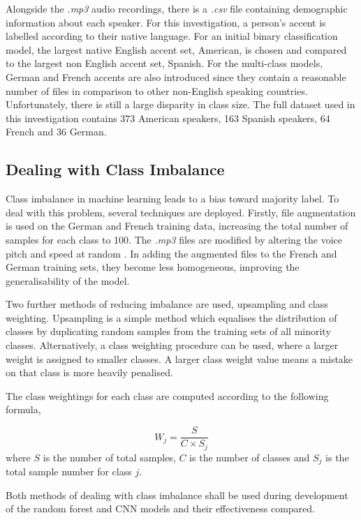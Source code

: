 \documentclass[conference]{IEEEtran}
\begin{document}
\bigbreak{}

Alongside the \textit{.mp3} audio recordings, there is a \textit{.csv} file containing demographic information about each speaker. For this investigation, a person's accent is labelled according to their native language. For an initial binary classification model, the largest native English accent set, American, is chosen and compared to the largest non English accent set, Spanish. For the multi-class models, German and French accents are also introduced since they contain a reasonable number of files in comparison to other non-English speaking countries. Unfortunately, there is still a large disparity in class size. The full dataset used in this investigation contains 373 American speakers, 163 Spanish speakers, 64 French and 36 German.

\subsection{Dealing with Class Imbalance}

Class imbalance in machine learning leads to a bias toward majority label. To deal with this problem, several techniques are deployed. Firstly, file augmentation is used on the German and French training data, increasing the total number of samples for each class to 100. The \textit{.mp3} files are modified by altering the voice pitch and speed at random \cite{fukuda18_interspeech}. In adding the augmented files to the French and German training sets, they become less homogeneous, improving the generalisability of the model.

Two further methods of reducing imbalance are used, upsampling and class weighting. Upsampling is a simple method which equalises the distribution of classes by duplicating random samples from the training sets of all minority classes. Alternatively, a class weighting procedure can be used, where a larger weight is assigned to smaller classes. A larger class weight value means a mistake on that class is more heavily penalised.

The class weightings for each class are computed according to the following formula,

\begin{equation}
W_{j}= \frac{S}{C \times S_{j}} 
\end{equation}
where $S$ is the number of total samples, $C$ is the number of classes and $S_j$ is the total sample number for class $j$. 

Both methods of dealing with class imbalance shall be used during development of the random forest and CNN models and their effectiveness compared. 
\end{document}
